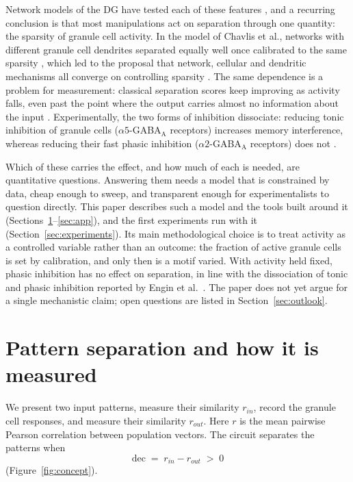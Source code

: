 \documentclass[11pt,a4paper]{article}
\begin{document}
Network models of the DG have tested each of these features
\cite{santhakumar2005,myers2009,myers2011,yim2015,chavlis2017,braganza2020,guzman2021,saini2025},
and a recurring conclusion is that most manipulations act on separation through
one quantity: the sparsity of granule cell activity. In the model of Chavlis et
al., networks with different granule cell dendrites separated equally well once
calibrated to the same sparsity \cite{chavlis2017}, which led to the proposal that
network, cellular and dendritic mechanisms all converge on controlling sparsity
\cite{chavlis2017review}. The same dependence is a problem for measurement:
classical separation scores keep improving as activity falls, even past the point
where the output carries almost no information about the input
\cite{bird2024}. Experimentally, the two forms of inhibition dissociate: reducing
tonic inhibition of granule cells ($\alpha5$-GABA$_\mathrm{A}$ receptors) increases
memory interference, whereas reducing their fast phasic inhibition
($\alpha2$-GABA$_\mathrm{A}$ receptors) does not \cite{engin2015}.

Which of these carries the effect, and how much of each is needed, are
quantitative questions. Answering them needs a model that is constrained by data,
cheap enough to sweep, and transparent enough for experimentalists to question
directly. This paper describes such a model and the tools built around it
(Sections~\ref{sec:mechanism}--\ref{sec:app}), and the first experiments run with
it (Section~\ref{sec:experiments}). Its main methodological choice is to treat
activity as a controlled variable rather than an outcome: the fraction of active
granule cells is set by calibration, and only then is a motif varied. With
activity held fixed, phasic inhibition has no effect on separation, in line with
the dissociation of tonic and phasic inhibition reported by Engin et al.\
\cite{engin2015}. The paper does not yet argue for a single mechanistic claim;
open questions are listed in Section~\ref{sec:outlook}.

\section{Pattern separation and how it is measured}
\label{sec:mechanism}

We present two input patterns, measure their similarity $r_{in}$, record the
granule cell responses, and measure their similarity $r_{out}$. Here $r$ is the
mean pairwise Pearson correlation between population vectors. The circuit
separates the patterns when
\begin{equation}
  \mathrm{dec} \;=\; r_{in} - r_{out} \;>\; 0
  \label{eq:dec}
\end{equation}
(Figure~\ref{fig:concept}).
\end{document}
